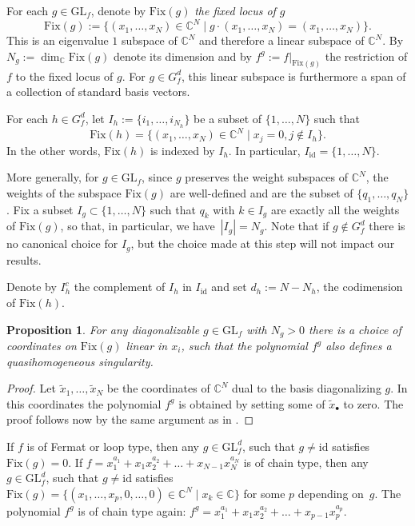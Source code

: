 \documentclass[10pt,a4paper]{amsart}
\numberwithin{equation}{section}
\newtheorem{Proposition}[Theorem]{Proposition}
 { \theoremstyle{definition}
\newtheorem{Definition}[Theorem]{Definition}
\newtheorem{Note}[Theorem]{Note}
\newtheorem{Example}[Theorem]{Example}
\newtheorem{Remark}[Theorem]{Remark} }
\newcommand{\CC}{{\mathbb{C}}}
\newcommand{\GL}{{\mathrm{GL}}}
\newcommand{\Fix}{\mathrm{Fix}}
\newcommand{\id}{\mathrm{id}}
\begin{document}
For each $g\in \GL_f$, denote by $\Fix(g)$ \textit{the fixed locus of $g$}
\begin{equation*}
 	\Fix(g):=\bigl\lbrace (x_1,\dots,x_N) \in\CC^N \mid g \cdot (x_1,\dots,x_N) = (x_1,\dots,x_N) \bigr\rbrace.
\end{equation*}
This is an eigenvalue $1$ subspace of $\CC^N$ and therefore a linear subspace of $\CC^N$.
By $N_g:=\dim_\CC\Fix(g)$ denote its dimension and by $f^g:=f|_{\Fix(g)}$ the restriction of $f$ to the fixed locus of $g$.
For $g\in G_f^d$, this linear subspace is furthermore a span of a collection of standard basis vectors.

For each $h\in G_f^d$, let $I_h := \{i_1,\dots,i_{N_h}\}$ be a subset of $\{1,\dots, N\}$ such that
\[
\Fix(h)=\bigl\{(x_1,\dots,x_N)\in\CC^N\mid x_{j}=0, j\notin I_h\bigr\}.
\]
In the other words, $\Fix(h)$ is indexed by $I_h$.
In particular, $I_{\id}=\{1,\dots, N\}$.

More generally, for $g\in \GL_f$, since $g$ preserves the weight subspaces of $\CC^N$, the weights of the subspace $\Fix(g)$ are well-defined and are the subset of $\{q_1,\ldots,q_N\}$. Fix a subset ${I_g\subset \{1,\ldots,N\}}$ such that $q_k$ with $k\in I_g$ are exactly all the weights of $\Fix(g)$, so that, in particular, we have~${|I_g|=N_g}$. Note that if $g\not\in G_f^d$ there is no canonical choice for $I_g$, but the choice made at this step will not impact our results.

Denote by $I_h^c$ the complement of $I_h$ in $I_\id$ and set $d_h:=N-N_h$, the codimension of $\Fix(h)$.

\begin{Proposition}
	For any diagonalizable $g \in \GL_f$ with $N_g > 0$ there is a choice of coordinates on $\Fix(g)$ linear in $x_i$, such that the polynomial $f^g$ also defines a quasihomogeneous singularity.
\end{Proposition}
\begin{proof}
	Let $\widetilde x_1,\dots, \widetilde x_N$ be the coordinates of $\CC^N$ dual to the basis diagonalizing $g$. In this coordinates the polynomial $f^g$ is obtained by setting some of $\widetilde x_\bullet$ to zero. The proof follows now by the same argument as in \cite[Proposition~5]{ET13}.
\end{proof}

\begin{Example}
If $f$ is of Fermat or loop type, then any $g \in \GL_f^d$, such that $g \neq \id$ satisfies $\Fix(g) = 0$.
If $f = x_1^{a_1} + x_1x_2^{a_2} + \dots +x_{N-1}x_N^{a_N}$ is of chain type, then any $g \in \GL_f^d$, such that $g \neq \id$ satisfies
$\Fix(g) = \bigl\lbrace (x_1,\dots,x_p,0,\dots,0) \in \CC^N \mid x_k \in \CC \bigr\rbrace$ for some $p$ depending on~$g$.
The polynomial $f^g$ is of chain type again: $f^g = x_1^{a_1} + x_1x_2^{a_2} + \dots +x_{p-1}x_p^{a_p}$.
\end{Example}
\end{document}
